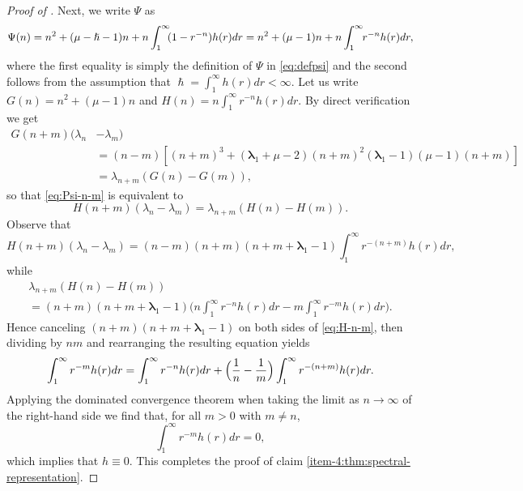\documentclass[JEP,XML,SOM,Unicode]{cedram}
\theoremstyle{plain}
\theoremstyle{definition}
\newcommand{\lam}{{\bm{\lambda}_1}}
\let\h\hslash
\let\mo\mu
\begin{document}
\begin{proof}[Proof of ]
Next, we write $\Psi$ as
\begin{equation*}
\Psi(n) = n^2 + (\mo-\h-1)n + n \int_1^\infty\hspace*{-1mm} (1-r^{-n})h(r)dr = n^2 + (\mo-1)n + n\int_1^\infty\hspace*{-1mm} r^{-n}h(r)dr,
\end{equation*}
where the first equality is simply the definition of $\Psi$ in \eqref{eq:defpsi} and the second follows from the assumption that $\h = \int_1^\infty h(r) dr < \infty$. Let us write $G(n) = n^2+(\mo-1)n$ and $H(n) = n\int_1^\infty r^{-n}h(r)dr$. By direct verification we get
\begin{align*}
G(n+m)(\lambda_n&-\lambda_m)\\
 &= (n-m)\left[(n+m)^3+(\lam + \mo-2)(n+m)^2 (\lam-1)(\mo-1)(n+m)\right] \\
&= \lambda_{n+m}(G(n)-G(m)),
\end{align*}
so that \eqref{eq:Psi-n-m} is equivalent to
\begin{equation}
\label{eq:H-n-m}
H(n+m)(\lambda_n-\lambda_m) = \lambda_{n+m}(H(n)-H(m)).
\end{equation}
Observe that
\begin{equation*}
H(n+m)\left(\lambda_n-\lambda_m\right) = (n-m)(n+m)\left(n+m+\lam-1\right) \int_1^\infty r^{-(n+m)}h(r)dr,
\end{equation*}
while
\begin{multline*}
\lambda_{n+m}\left(H(n)-H(m)\right)\\[-5pt]
= (n+m)(n+m+\lam-1)\biggl(n\int_1^\infty r^{-n}h(r)dr - m\int_1^\infty r^{-m}h(r)dr \biggr).
\end{multline*}
Hence canceling $(n+m)(n+m+\lam-1)$ on both sides of \eqref{eq:H-n-m}, then dividing by $nm$ and rearranging the resulting equation yields
\begin{equation*}
\int_1^\infty r^{-m} h(r)dr = \int_1^\infty r^{-n}h(r)dr + \Bigl(\frac{1}{n}-\frac{1}{m}\Bigr) \int_1^\infty r^{-(n+m)} h(r)dr.
\end{equation*}
Applying the dominated convergence theorem when taking the limit as $n \to \infty$ of the right-hand side we find that, for all $m > 0$ with $m \neq n$,
\begin{equation*}
\int_1^\infty r^{-m} h(r)dr = 0,
\end{equation*}
which implies that $h \equiv 0$. This completes the proof of claim \eqref{item-4:thm:spectral-representation}.\end{proof}
\end{document}

